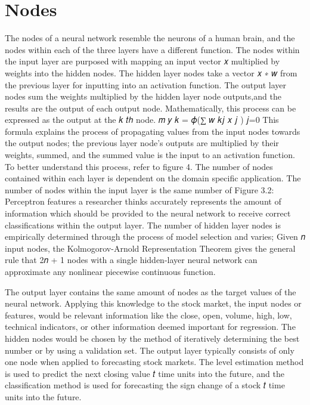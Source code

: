 \documentclass[../main.tex]{subfiles}
\begin{document}
    \section{Nodes}\label{sec:nodes}
    The nodes of a neural network resemble the neurons of a human brain, and the nodes within each of the three layers have a different function.
    The nodes within the input layer are purposed with mapping an input vector 𝑥 multiplied by weights into the hidden nodes.
    The hidden layer nodes take a vector 𝑥 ∗ 𝑤 from the previous layer for inputting into an activation function.
    The output layer nodes sum the weights multiplied by the hidden layer node outputs,and the results are the output of each output node.
    Mathematically, this process can be expressed as the output at the 𝑘 𝑡ℎ node.
    𝑚
    𝑦 𝑘 = 𝜙(∑ 𝑤 𝑘𝑗 𝑥 𝑗 )
    𝑗=0
    This formula explains the process of propagating values from the input nodes towards the output nodes; the previous layer node's outputs are multiplied by their weights, summed, and the summed value is the input to an activation function.
    To better understand this process, refer to figure 4.
    The number of nodes contained within each layer is dependent on the domain specific application.
    The number of nodes within the input layer is the same number of Figure 3.2: Perceptron features a researcher thinks accurately represents the amount of information which should be provided to the neural network to receive correct classifications within the output layer.
    The number of hidden layer nodes is empirically determined through the process of model selection and varies; Given 𝑛 input nodes, the Kolmogorov-Arnold Representation Theorem gives the general rule that 2𝑛 + 1 nodes with a single hidden-layer neural network can approximate any nonlinear piecewise continuous function.

    The output layer contains the same amount of nodes as the target values of the neural network.
    Applying this knowledge to the stock market, the input nodes or features, would be relevant information like the close, open, volume, high, low, technical indicators, or other information deemed important for regression.
    The hidden nodes would be chosen by the method of iteratively determining the best number or by using a validation set.
    The output layer typically consists of only one node when applied to forecasting stock markets.
    The level estimation method is used to predict the next closing value 𝑡 time units into the future, and the  classification method is used for forecasting the sign change of a stock 𝑡 time units into the future.
\end{document}
